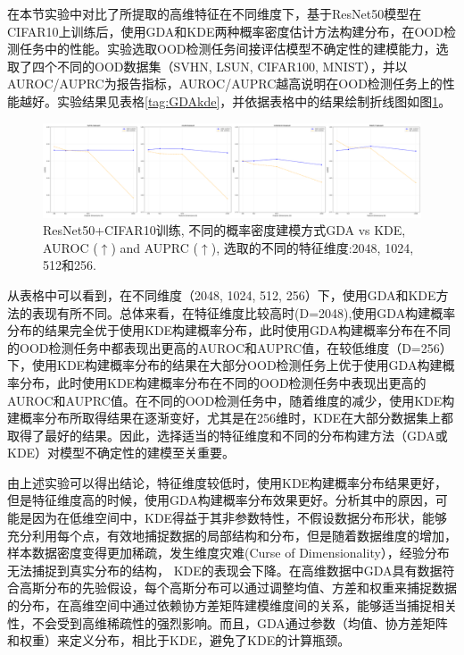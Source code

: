 在本节实验中对比了所提取的高维特征在不同维度下，基于ResNet50模型在CIFAR10上训练后，使用GDA和KDE两种概率密度估计方法构建分布，在OOD检测任务中的性能。实验选取OOD检测任务间接评估模型不确定性的建模能力，选取了四个不同的OOD数据集（SVHN, LSUN, CIFAR100, MNIST），并以AUROC/AUPRC为报告指标，AUROC/AUPRC越高说明在OOD检测任务上的性能越好。实验结果见表格\ref{tag:GDAkde}，并依据表格中的结果绘制折线图如图\ref{fig:GDAkde2}。
\begin{figure}[h]
    \captionsetup{font=small, justification=centering}
    \centering
    \includegraphics[width=0.9\linewidth]{assets/GDA_kde_dimension.png}
    \caption{ResNet50+CIFAR10训练, 不同的概率密度建模方式GDA vs KDE, AUROC ($\uparrow$) and AUPRC ($\uparrow$), 选取的不同的特征维度:2048, 1024, 512和256.}
    \label{fig:GDAkde2}
\end{figure}

从表格中可以看到，在不同维度（2048, 1024, 512, 256）下，使用GDA和KDE方法的表现有所不同。总体来看，在特征维度比较高时(D=2048),使用GDA构建概率分布的结果完全优于使用KDE构建概率分布，此时使用GDA构建概率分布在不同的OOD检测任务中都表现出更高的AUROC和AUPRC值，在较低维度（D=256）下，使用KDE构建概率分布的结果在大部分OOD检测任务上优于使用GDA构建概率分布，此时使用KDE构建概率分布在不同的OOD检测任务中表现出更高的AUROC和AUPRC值。在不同的OOD检测任务中，随着维度的减少，使用KDE构建概率分布所取得结果在逐渐变好，尤其是在256维时，KDE在大部分数据集上都取得了最好的结果。因此，选择适当的特征维度和不同的分布构建方法（GDA或KDE）对模型不确定性的建模至关重要。

由上述实验可以得出结论，特征维度较低时，使用KDE构建概率分布结果更好，但是特征维度高的时候，使用GDA构建概率分布效果更好。分析其中的原因，可能是因为在低维空间中，KDE得益于其非参数特性，不假设数据分布形状，能够充分利用每个点，有效地捕捉数据的局部结构和分布，但是随着数据维度的增加，样本数据密度变得更加稀疏，发生维度灾难(Curse of Dimensionality）\cite{murphy2012machine}，经验分布无法捕捉到真实分布的结构， KDE的表现会下降。在高维数据中GDA具有数据符合高斯分布的先验假设，每个高斯分布可以通过调整均值、方差和权重来捕捉数据的分布，在高维空间中通过依赖协方差矩阵建模维度间的关系，能够适当捕捉相关性，不会受到高维稀疏性的强烈影响。而且，GDA通过参数（均值、协方差矩阵和权重）来定义分布，相比于KDE，避免了KDE的计算瓶颈。 


